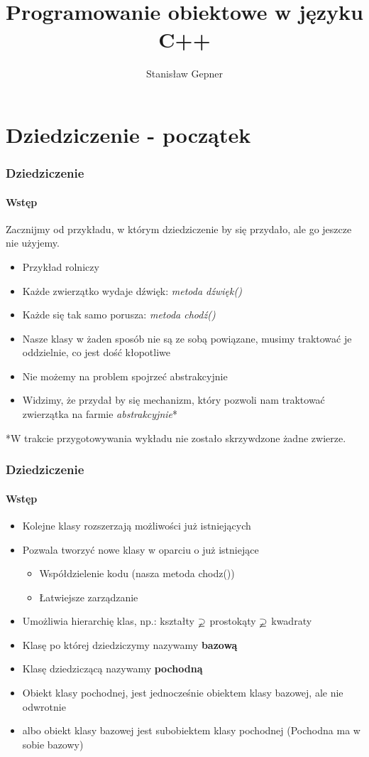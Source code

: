 \documentclass[10pt]{beamer}
\title{Programowanie obiektowe w języku C++}
\author[shortname]{Stanis{\l}aw Gepner}
\institute[shortinst]{sgepner@meil.pw.edu.pl}
\date{}
\begin{document}
\frame{
    \titlepage
}

\section{Dziedziczenie - początek}

\begin{frame}
  \frametitle{Dziedziczenie}
  \framesubtitle{Wstęp}

	\centering
	Zacznijmy od przykładu, w którym dziedziczenie by się przydało, ale go jeszcze nie użyjemy.
  
  \begin{itemize}
    \item Przykład rolniczy
    \item Każde zwierzątko wydaje dźwięk: {\it metoda dźwięk()}
    \item Każde się tak samo porusza: {\it metoda chodź()}
    \item Nasze klasy w żaden sposób nie są ze sobą powiązane, musimy traktować je oddzielnie, co jest dość kłopotliwe
    \item Nie możemy na problem spojrzeć abstrakcyjnie
		\item Widzimy, że przydał by się mechanizm, który pozwoli nam traktować zwierzątka na farmie {\it abstrakcyjnie}*
  \end{itemize}
  
  \vspace*{1cm}
  *{\tiny W trakcie przygotowywania wykładu nie zostało skrzywdzone żadne zwierze.}
\end{frame}

\begin{frame}
  \frametitle{Dziedziczenie}
  \framesubtitle{Wstęp}
  	\begin{itemize}
	    \item Kolejne klasy rozszerzają możliwości już istniejących
	    \item Pozwala tworzyć nowe klasy w oparciu o już istniejące
	    \begin{itemize}
	    	\item Współdzielenie kodu (nasza metoda chodz())
	    	\item Łatwiejsze zarządzanie
	    \end{itemize}
	    \item Umożliwia hierarchię klas, np.: kształty $\varsupsetneq$ prostokąty $\varsupsetneq$ kwadraty
	    \item Klasę po której dziedziczymy nazywamy \textbf{bazową}
	    \item Klasę dziedziczącą nazywamy \textbf{pochodną}
	    \item Obiekt klasy pochodnej, jest jednocześnie obiektem klasy bazowej, ale nie odwrotnie
	    \item albo obiekt klasy bazowej jest subobiektem klasy pochodnej (Pochodna ma w sobie bazowy) 
  \end{itemize}
\end{frame}
\end{document}
